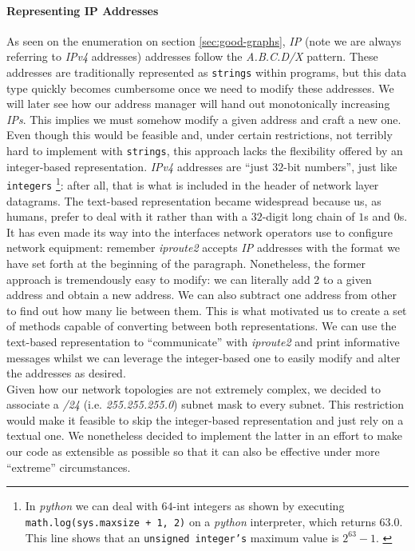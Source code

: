     \paragraph{Representing IP Addresses}
        As seen on the enumeration on section \ref{sec:good-graphs}, \textit{IP} (note we are always referring to \textit{IPv4} addresses) addresses follow the \textit{A.B.C.D/X} pattern. These addresses are traditionally represented as \texttt{strings} within programs, but this data type quickly becomes cumbersome once we need to modify these addresses. We will later see how our address manager will hand out monotonically increasing \textit{IPs}. This implies we must somehow modify a given address and craft a new one. Even though this would be feasible and, under certain restrictions, not terribly hard to implement with \texttt{strings}, this approach lacks the flexibility offered by an integer-based representation. \textit{IPv4} addresses are ``just $32$-bit numbers'', just like \texttt{integers} \footnote{In \textit{python} we can deal with $64$-int integers as shown by executing \texttt{math.log(sys.maxsize + 1, 2)} on a \textit{python} interpreter, which returns $63.0$. This line shows that an \texttt{unsigned integer's} maximum value is $2^{63} - 1$. \cite{bib:python-sys}}: after all, that is what is included in the header of network layer datagrams. The text-based representation became widespread because us, as humans, prefer to deal with it rather than with a $32$-digit long chain of $1$s and $0$s. It has even made its way into the interfaces network operators use to configure network equipment: remember \textit{iproute2} accepts \textit{IP} addresses with the format we have set forth at the beginning of the paragraph. Nonetheless, the former approach is tremendously easy to modify: we can literally add $2$ to a given address and obtain a new address. We can also subtract one address from other to find out how many lie between them. This is what motivated us to create a set of methods capable of converting between both representations. We can use the text-based representation to ``communicate'' with \textit{iproute2} and print informative messages whilst we can leverage the integer-based one to easily modify and alter the addresses as desired.\\

    Given how our network topologies are not extremely complex, we decided to associate a \textit{/24} (i.e. \textit{255.255.255.0}) subnet mask to every subnet. This restriction would make it feasible to skip the integer-based representation and just rely on a textual one. We nonetheless decided to implement the latter in an effort to make our code as extensible as possible so that it can also be effective under more ``extreme'' circumstances.\\

